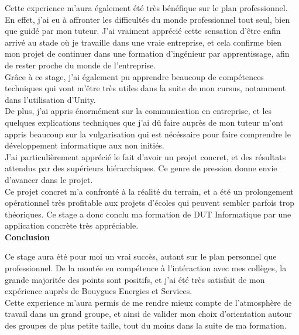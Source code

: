 \documentclass[a4paper]{article}
\begin{document}
    Cette experience m'aura également été très bénéfique sur le plan professionnel. En effet, j'ai eu à affronter les difficultés du monde professionnel tout seul, bien que guidé par mon tuteur. J'ai vraiment apprécié cette sensation d'être enfin arrivé au stade où je travaille dans une vraie entreprise, et cela confirme bien mon projet de continuer dans une formation d'ingénieur par apprentissage, afin de rester proche du monde de l'entreprise. \\

    Grâce à ce stage, j'ai également pu apprendre beaucoup de compétences techniques qui vont m'être très utiles dans la suite de mon cursus, notamment dans l'utilisation d'Unity. \\ 

    De plus, j'ai appris énormément sur la communication en entreprise, et les quelques explications techniques que j'ai dû faire auprès de mon tuteur m'ont appris beaucoup sur la vulgarisation qui est nécéssaire pour faire comprendre le développement informatique aux non initiés. \\ 

    J'ai particulièrement apprécié le fait d'avoir un projet concret, et des résultats attendus par des supérieurs hiérarchiques. Ce genre de pression donne envie d'avancer dans le projet. \\
    
    Ce projet concret m'a confronté à la réalité du terrain, et a été un prolongement opérationnel très profitable aux projets d'écoles qui peuvent sembler parfois trop théoriques. Ce stage a donc conclu ma formation de DUT Informatique par une application concrète très appréciable. \\

    \huge \textbf{Conclusion} \vspace{5pt} \\
   \normalsize
   
    Ce stage aura été pour moi un vrai succès, autant sur le plan personnel que professionnel. De la montée en compétence à l'intéraction avec mes collèges, la grande majoritée des points sont positifs, et j'ai été très satisfait de mon expérience auprès de Bouygues Energies et Services. \\

    Cette experience m'aura permis de me rendre mieux compte de l'atmosphère de travail dans un grand groupe, et ainsi de valider mon choix d'orientation autour des groupes de plus petite taille, tout du moins dans la suite de ma formation. \\
\end{document}
